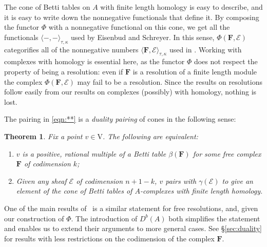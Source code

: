 \documentclass[12pt]{amsart}
\newtheorem{thm}[lemma]{Theorem}
\theoremstyle{definition}
\theoremstyle{remark}
\newcommand{\VV}{\mathrm{V}}
\newcommand{\cE}{\mathcal{E}}
\newcommand{\FF}{\mathbf{F}}
\begin{document}
The cone of Betti tables on $A$ with finite length homology is easy to describe, and it is easy to write down the nonnegative functionals that define it.
By composing the functor $\Phi$ with a nonnegative functional on this cone, we get all the functionals $\langle -,-\rangle_{\tau,\kappa}$ used by Eisenbud and Schreyer. In this sense, $\Phi(\FF,\cE)$ categorifies all of the nonnegative numbers $\langle \FF, \cE\rangle_{\tau,\kappa}$ used in \cite{eis-schrey1}. Working with complexes with homology is essential here, as the functor $\Phi$ does not respect the property of being a resolution: even if $\FF$ is a resolution of a finite length module the complex $\Phi(\FF,\cE)$ may fail to be a resolution. Since the results on resolutions follow easily from our results on complexes (possibly) with homology, nothing is lost.

The pairing in \eqref{eqn:**} is a \emph{duality pairing} of cones in the following sense:
 
\begin{thm}\label{thm:duality}
Fix a point $v\in \VV$.   The following are equivalent:
\begin{enumerate}
	\item   $v$ is a positive, rational multiple of a Betti table $\beta(\FF)$ for some free complex $\FF$ of codimension $k$;
	\item  Given any sheaf $\cE$ of codimension $n+1-k$, $v$ pairs with $\gamma(\cE)$ to give an element of the cone of Betti tables of $A$-complexes with finite length homology.
\end{enumerate}
\end{thm}
One of the main results of~\cite{eis-schrey1} is a similar statement for free resolutions, and, given our construction of $\Phi$. The introduction of $D^{b}(A)$ both simplifies the statement and enables us to extend their arguments to  more general cases.  See \S\ref{sec:duality} for results with less restrictions on the codimension of the complex $\FF$.
\end{document}
